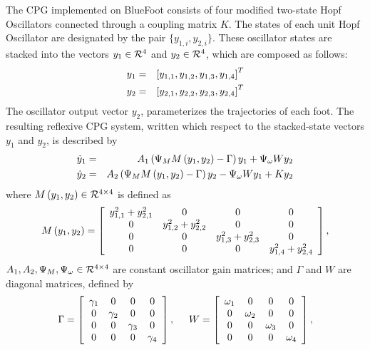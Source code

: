 		The CPG implemented on BlueFoot consists of four modified two-state Hopf Oscillators connected through a coupling matrix $K$. The states of each \Ith unit Hopf Oscillator are designated by the pair $\{y_{1,i},y_{2,i}\}$. These oscillator states are stacked into the vectors $y_{1}\in {\cal R}^{4}$ and $y_{2}\in {\cal R}^{4}$, which are composed as follows:
			\begin{eqnarray*}
				y_{1} &=& \left[y_{1,1},y_{1,2},y_{1,3},y_{1,4}\right]^{T}\nonumber\\
				y_{2} &=& \left[y_{2,1},y_{2,2},y_{2,3},y_{2,4}\right]^{T}
			\end{eqnarray*}
		The oscillator output vector $y_{2}$, parameterizes the trajectories of each \Ith foot. The resulting reflexive CPG system, written which respect to the stacked-state vectors $y_{1}$ and $y_{2}$, is described by
			\begin{eqnarray}
				\dot{y}_{1} &=& A_{1}\wrap{ \Psi_{M} M\wrap{y_{1},y_{2}} - \Gamma}{y}_{1} + \Psi_{\omega} W {y}_{2} 			\nonumber\\
				\dot{y}_{2} &=& A_{2}\wrap{ \Psi_{M} M\wrap{y_{1},y_{2}} - \Gamma}{y}_{2} - \Psi_{\omega} W {y}_{1} + K {y}_{2}	%
				\label{eq::cpg_ss_def}
			\end{eqnarray}
		where $M\left(y_{1},y_{2}\right) \in {\cal R}^{4\times4}$ is defined as
			\newcommand{\yy}[1]{y_{1,#1}^{2} + y_{2,#1}^{2}}
			\begin{equation*}
				M\wrap{y_{1},y_{2}} = \left[
				\begin{array}{cccc}
				\yy{1} 	& 	0 		& 	0 		& 	0 		\\ 
				0		& 	\yy{2}  & 	0 		& 	0 		\\ 
				0 		& 	0 		& 	\yy{3}  & 	0 		\\ 
				0 		& 	0 		& 	0 		& 	\yy{4}  \\ 
				\end{array}
				\right],
			\end{equation*}
		${A_{1},A_{2}, \Psi_{M}, \Psi_{\omega}} \in{\cal R}^{4\times4}$ are constant oscillator gain matrices; and $\Gamma$ and $W$ are diagonal matrices, defined by
			\begin{equation*}
				\Gamma = \left[
				\begin{array}{cccc}
				\gamma_{1} 	& 	0 				& 	0 				& 	0 		\\ 
				0				& 	\gamma_{2} 	& 	0 				& 	0 		\\ 
				0 				& 	0 				& 	\gamma_{3} 	& 	0 		\\ 
				0 				& 	0 				& 	0 				& 	\gamma_{4}  \\ 
				\end{array}
				\right],
				\hspace{5mm}
				W = \left[
				\begin{array}{cccc}
				\omega_{1} 	& 	0 				& 	0 				& 	0 		\\ 
				0				& 	\omega_{2} 	& 	0 				& 	0 		\\ 
				0 				& 	0 				& 	\omega_{3} 	& 	0 		\\ 
				0 				& 	0 				& 	0 				& 	\omega_{4}  \\ 
				\end{array}
				\right],
			\end{equation*}
